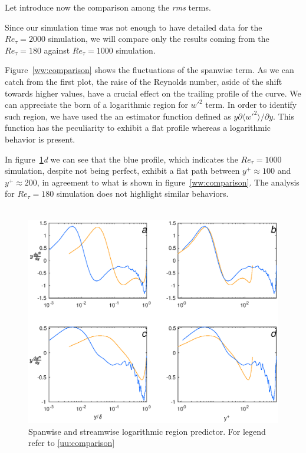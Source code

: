 Let introduce now the comparison among the \emph{rms} terms. \par
Since our simulation time was not enough to have detailed data for the $Re_{\tau}=2000$ simulation, we will compare only the results coming from the $Re_{\tau}=180$ against $Re_{\tau}=1000$ simulation.\par
Figure~\ref{ww:comparison} shows the fluctuations of the spanwise term. As we can catch from the first plot, the raise of the Reynolds number, aside of the shift towards higher values, have a crucial effect on the trailing profile of the curve. We can appreciate the born of a logarithmic region for $w'^{2}$ term. In order to identify such region, we have used the an estimator function defined as $y\partial\langle w'^{2} \rangle/\partial{y}$. This function has the peculiarity to exhibit a flat profile whereas a logarithmic behavior is present.\par

In figure~\ref{d2:rms}\emph{d} we can see that the blue profile, which indicates the $Re_{\tau}=1000$ simulation, despite not being perfect, exhibit a flat path between $y^{+}\approx100$ and $y^{+}\approx200$, in agreement to what is shown in figure~\ref{ww:comparison}.
The analysis for $Re_{\tau}=180$ simulation does not highlight similar behaviors.\\~\par

\begin{figure}
\begin{center}
\includegraphics[scale=0.55]{grafici/d2rms.eps}
\caption{Spanwise and streamwise logarithmic region predictor. For legend refer to \ref{uu:comparison}}
\label{d2:rms}
\end{center}
\end{figure}

